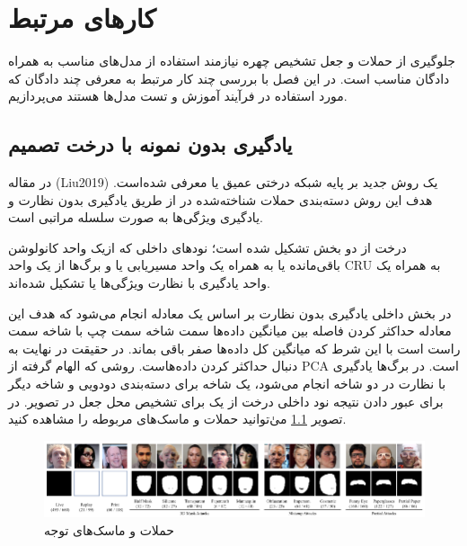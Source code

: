 \chapter{کارهای مرتبط}
\label{chap:three}

جلوگیری از حملات و جعل تشخیص چهره نیازمند استفاده از مدل‌های مناسب به همراه دادگان مناسب است. در این فصل با بررسی چند کار مرتبط به معرفی چند دادگان که مورد استفاده در فرآیند آموزش و تست مدل‌ها هستند می‌پردازیم.

\section{یادگیری بدون نمونه با درخت تصمیم}
در مقاله (Liu2019)
\cite{Liu2019}
 یک روش جدید بر پایه شبکه درختی عمیق یا 
معرفی شده‌است. هدف این روش دسته‌بندی حملات شناخته‌شده در 
از طریق یادگیری بدون نظارت و یادگیری ویژگی‌ها به صورت سلسله مراتبی است.

درخت از دو بخش تشکیل شده است؛ نود‌های داخلی که ازیک واحد کانولوشن باقی‌مانده یا 
به همراه یک واحد مسیریابی یا 
و برگ‌ها از یک واحد CRU به همراه یک واحد یادگیری با نظارت ویژگی‌ها یا
تشکیل شده‌اند. 

در بخش داخلی یادگیری بدون نظارت بر اساس یک معادله انجام می‌شود که هدف این معادله حداکثر کردن فاصله بین میانگین داده‌ها سمت شاخه سمت چپ با شاخه سمت راست است با این شرط که میانگین کل داده‌ها صفر باقی بماند. در حقیقت در نهایت به دنبال حداکثر کردن 
داده‌هاست. روشی که الهام گرفته از PCA است. در برگ‌ها یادگیری با نظارت در دو‌ شاخه انجام می‌شود، یک شاخه برای دسته‌بندی دودویی و شاخه دیگر برای عبور دادن نتیجه نود‌ داخلی درخت از یک 
برای تشخیص محل جعل در تصویر. در تصویر 
\ref{fig:Deep_tree_mask} 
می‌ٰتوانید حملات و ماسک‌های مربوطه را مشاهده کنید.
\begin{figure}[h]
	\centering
	\includegraphics[width=1\textwidth]{img/report/Deep_tree_mask}
	\caption{حملات و ماسک‌های توجه\cite{Liu2019}}
	\label{fig:Deep_tree_mask}
	\centering
\end{figure}

